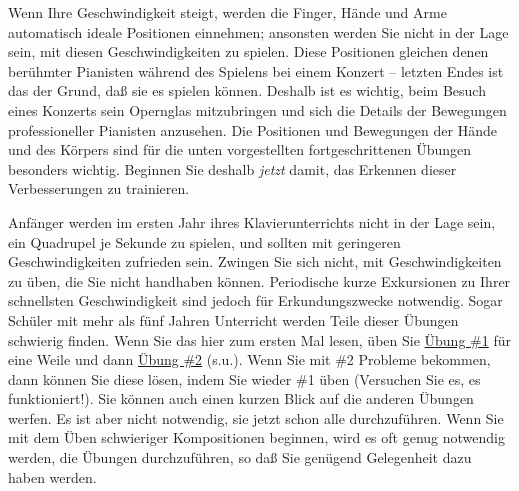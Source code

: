 Wenn Ihre Geschwindigkeit steigt, werden die Finger, Hände und Arme automatisch ideale Positionen einnehmen; ansonsten werden Sie nicht in der Lage sein, mit diesen Geschwindigkeiten zu spielen.
Diese Positionen gleichen denen berühmter Pianisten während des Spielens bei einem Konzert -- letzten Endes ist das der Grund, daß sie es spielen können.
Deshalb ist es wichtig, beim Besuch eines Konzerts sein Opernglas mitzubringen und sich die Details der Bewegungen professioneller Pianisten anzusehen.
Die Positionen und Bewegungen der Hände und des Körpers sind für die unten vorgestellten fortgeschrittenen Übungen besonders wichtig.
Beginnen Sie deshalb \textit{jetzt} damit, das Erkennen dieser Verbesserungen zu trainieren.

Anfänger werden im ersten Jahr ihres Klavierunterrichts nicht in der Lage sein, ein Quadrupel je Sekunde zu spielen, und sollten mit geringeren Geschwindigkeiten zufrieden sein.
Zwingen Sie sich nicht, mit Geschwindigkeiten zu üben, die Sie nicht handhaben können.
Periodische kurze Exkursionen zu Ihrer schnellsten Geschwindigkeit sind jedoch für Erkundungszwecke notwendig.
Sogar Schüler mit mehr als fünf Jahren Unterricht werden Teile dieser Übungen schwierig finden.
Wenn Sie das hier zum ersten Mal lesen, üben Sie \hyperref[c1iii7b1]{Übung \#1} für eine Weile und dann \hyperref[c1iii7b2]{Übung \#2} (s.u.).
Wenn Sie mit \#2 Probleme bekommen, dann können Sie diese lösen, indem Sie wieder \#1 üben (Versuchen Sie es, es funktioniert!).
Sie können auch einen kurzen Blick auf die anderen Übungen werfen.
Es ist aber nicht notwendig, sie jetzt schon alle durchzuführen.
Wenn Sie mit dem Üben schwieriger Kompositionen beginnen, wird es oft genug notwendig werden, die Übungen durchzuführen, so daß Sie genügend Gelegenheit dazu haben werden.

